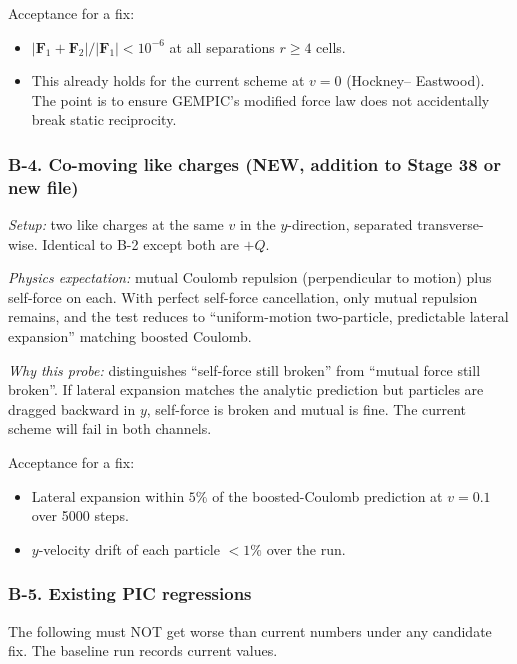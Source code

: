 \documentclass[11pt,a4paper]{article}
\newcommand{\vv}[1]{\mathbf{#1}}
\begin{document}
Acceptance for a fix:
\begin{itemize}
  \item $|\vv{F}_1 + \vv{F}_2| / |\vv{F}_1| < 10^{-6}$ at all
    separations $r \ge 4$ cells.
  \item This already holds for the current scheme at $v=0$ (Hockney--
    Eastwood).  The point is to ensure GEMPIC's modified force law
    does not accidentally break static reciprocity.
\end{itemize}

\subsubsection*{B-4.  Co-moving like charges (NEW, addition to Stage 38 or new file)}

\emph{Setup:} two like charges at the same $v$ in the $y$-direction,
separated transverse-wise.  Identical to B-2 except both are $+Q$.

\emph{Physics expectation:} mutual Coulomb repulsion (perpendicular
to motion) plus self-force on each.  With perfect self-force
cancellation, only mutual repulsion remains, and the test reduces to
``uniform-motion two-particle, predictable lateral expansion''
matching boosted Coulomb.

\emph{Why this probe:} distinguishes ``self-force still broken'' from
``mutual force still broken''.  If lateral expansion matches the
analytic prediction but particles are dragged backward in $y$,
self-force is broken and mutual is fine.  The current scheme will
fail in both channels.

Acceptance for a fix:
\begin{itemize}
  \item Lateral expansion within $5\%$ of the boosted-Coulomb
    prediction at $v=0.1$ over 5000 steps.
  \item $y$-velocity drift of each particle $< 1\%$ over the run.
\end{itemize}

\subsubsection*{B-5.  Existing PIC regressions}

The following must NOT get worse than current numbers under any
candidate fix.  The baseline run records current values.
\end{document}
